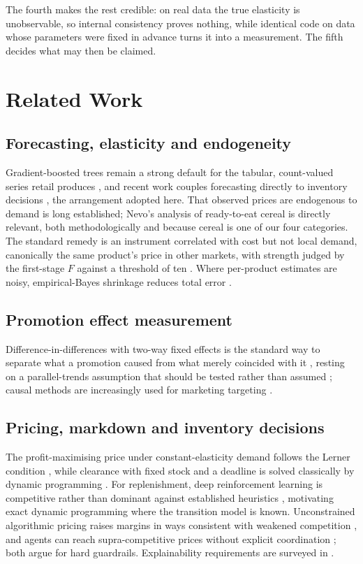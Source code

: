 \documentclass[conference,a4paper]{IEEEtran}
\begin{document}
The fourth makes the rest credible: on real data the true elasticity is
unobservable, so internal consistency proves nothing, while identical code on
data whose parameters were fixed in advance turns it into a measurement. The
fifth decides what may then be claimed.

\section{Related Work}

\subsection{Forecasting, elasticity and endogeneity}
Gradient-boosted trees remain a strong default for the tabular, count-valued
series retail produces \cite{friedman2001}, and recent work couples forecasting
directly to inventory decisions \cite{yang2025}, the arrangement adopted here.
That observed prices are endogenous to demand is long established; Nevo's
analysis of ready-to-eat cereal \cite{nevo2001} is directly relevant, both
methodologically and because cereal is one of our four categories. The standard
remedy is an instrument correlated with cost but not local demand, canonically
the same product's price in other markets, with strength judged by the
first-stage $F$ against a threshold of ten \cite{stock2005}. Where per-product
estimates are noisy, empirical-Bayes shrinkage reduces total error
\cite{efron1973}.

\subsection{Promotion effect measurement}
Difference-in-differences with two-way fixed effects is the standard way to
separate what a promotion caused from what merely coincided with it
\cite{angrist2009}, resting on a parallel-trends assumption that should be tested
rather than assumed \cite{bertrand2004}; causal methods are increasingly used for
marketing targeting \cite{lemmens2025}.

\subsection{Pricing, markdown and inventory decisions}
The profit-maximising price under constant-elasticity demand follows the Lerner
condition \cite{lerner1934}, while clearance with fixed stock and a deadline is
solved classically by dynamic programming \cite{gallego1994}. For replenishment,
deep reinforcement learning is competitive rather than dominant against
established heuristics \cite{gijsbrechts2022}, motivating exact dynamic
programming where the transition model is known. Unconstrained algorithmic pricing
raises margins in ways consistent with weakened competition \cite{assad2024}, and
agents can reach supra-competitive prices without explicit coordination
\cite{fish2024}; both argue for hard guardrails. Explainability requirements are
surveyed in \cite{debock2024}.
\end{document}
